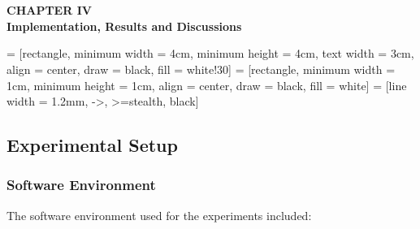 \section*{}
\begin{center}
    {\fontsize{14}{1.5}\selectfont \textbf{CHAPTER IV}}\\
    \vspace{12pt}
    {\fontsize{16}{1.5}\selectfont \textbf{Implementation, Results and Discussions}}\\
    \vspace{12pt}
    \vspace{12pt}
\end{center}

\setcounter{section}{4}
\setcounter{subsection}{0}
\renewcommand{\theequation}{\thesection.\arabic{equation}}
\renewcommand{\thetable}{\thesection.\arabic{table}}
\renewcommand{\thefigure}{\thesection.\arabic{figure}}
\setcounter{table}{0}
\setcounter{figure}{0}

\setcounter{equation}{0}
\setlength{\parindent}{0pt}
\usetikzlibrary{positioning, shapes}
 = [rectangle, minimum width = 4cm, minimum height = 4cm, text width = 3cm, align = center, draw = black, fill = white!30]
 = [rectangle, minimum width = 1cm, minimum height = 1cm, align = center, draw = black, fill = white]
 = [line width = 1.2mm, ->, >=stealth, black]

\subsection{Experimental Setup}

\subsubsection{Software Environment}

The software environment used for the experiments included:

